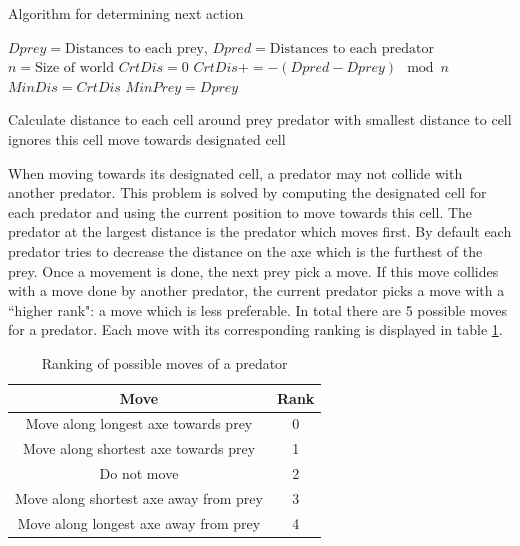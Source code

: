 \documentclass[10pt]{article}
\begin{document}
\begin{algorithm}
\caption{Algorithm for determining next action}
\label{alg_hunt}
	\begin{algorithmic}
\REQUIRE $Dprey=\textrm{Distances to each prey}$, $Dpred=\textrm{Distances to each predator}$
\STATE $n=\textrm{Size of world}$
\STATE {}
\STATE $CrtDis=0$
\STATE $CrtDis += -(Dpred-Dprey)\mod n$
\ENDFOR
{}
\STATE $MinDis=CrtDis$
\STATE $MinPrey = Dprey$
\ENDIF
\ENDFOR

\STATE {}
\STATE Calculate distance to each cell around prey
\STATE predator with smallest distance to cell ignores this cell
\ENDIF
\ENDFOR
\STATE move towards designated cell
\end{algorithmic}
\end{algorithm}

When moving towards its designated cell, a predator may not collide with another predator. This problem is solved by computing the designated cell for each predator and using the current position to move towards this cell. The predator at the largest distance is the predator which moves first. By default each predator tries to decrease the distance on the axe which is the furthest of the prey. Once a movement is done, the next prey pick a move. If this move collides with a move done by another predator, the current predator picks a move with a ``higher rank": a move which is less preferable. In total there are 5 possible moves for a predator. Each move with its corresponding ranking is displayed in table \ref{tab_moveRank}.

\begin{table}[h!tb]
\centering
	\caption{Ranking of possible moves of a predator}
\label{tab_moveRank}
\begin{tabular}{c|c}
Move 							& Rank \\ \hline
Move along longest axe towards prey	& 0 \\
Move along shortest axe towards prey	& 1 \\
Do not move						& 2 \\
Move along shortest axe away from prey	& 3 \\
Move along longest axe away from prey	& 4
\end{tabular}
\end{table}
\end{document}
